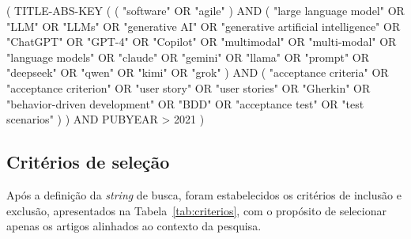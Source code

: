 \begin{center}
( TITLE-ABS-KEY ( ( "software" OR "agile" ) AND ( "large language model" OR "LLM" OR "LLMs" OR "generative AI" OR "generative artificial intelligence" OR "ChatGPT" OR "GPT-4" OR "Copilot" OR "multimodal" OR "multi-modal" OR "language models" OR "claude" OR "gemini" OR "llama" OR "prompt" OR "deepseek" OR "qwen" OR "kimi" OR "grok" ) AND ( "acceptance criteria" OR "acceptance criterion" OR "user story" OR "user stories" OR "Gherkin" OR "behavior-driven development" OR "BDD" OR "acceptance test" OR "test scenarios" ) ) AND PUBYEAR > 2021 )
\end{center}

\subsection{Critérios de seleção}
\label{sec:criterios}

Após a definição da \textit{string} de busca, foram estabelecidos os critérios de inclusão e exclusão, apresentados na Tabela~\ref{tab:criterios}, com o propósito de selecionar apenas os artigos alinhados ao contexto da pesquisa.

